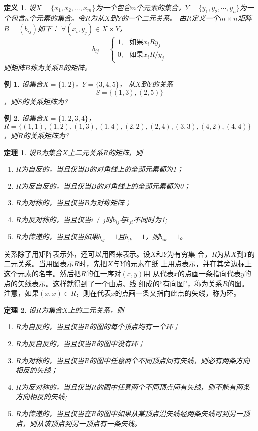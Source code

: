 \documentclass{book}[oneside]
\newtheorem{Def}{定义}[chapter]
\newtheorem{Thm}{定理}[chapter]
\newtheorem{Example}{例}[chapter]
\begin{document}
\begin{CJK*}{UTF8}{gbsn}
   \begin{Def}
    设$X=\{x_1, x_2, \ldots, x_m\}$为一个包含$m$个元素的集合，$Y=\{y_1, y_2,
    \cdots, y_n\}$为一个包含$n$个元素的集合。令$R$为从$X$到$Y$的一个二元关系。
    由$R$定义一个$m \times n$矩阵$B = (b_{ij})$如下： $\forall (x_i, y_j) \in X \times Y$，
\[
    b_{ij}=
      \begin{cases}
        1,&\text{如果}x_iRy_j\\
        0,&\text{如果}x_iR\!\!\! / y_j
      \end{cases}
\]
    则矩阵$B$称为关系$R$的矩阵。
  \end{Def}

  \begin{Example}
    设集合$X=\{1,2\}$，$Y=\{3,4,5\}$， 从$X$到$Y$的关系\[S=\{(1,3), (2, 5)\}\]，则$S$的关系矩阵为?
  \end{Example}
  
  \begin{Example}
    设集合$X = \{1,2,3,4\}$，$R = \{(1,1),(1,2),(1,3),(1,4),(2,2),(2,4),(3,3),(4,2),(4,4)\}$，则$R$的关系矩阵为?
  \end{Example}

  \begin{Thm}
  设$B$为集合$X$上二元关系$R$的矩阵，则
  \begin{enumerate}
  \item $R$为自反的，当且仅当$B$的对角线上的全部元素都为1；
  \item $R$为反自反的，当且仅当$B$的对角线上的全部元素都为0；
  \item $R$为对称的，当且仅当$B$为对称矩阵；
  \item $R$为反对称的，当且仅当$i \neq j$时$b_{ij}$与$b_{ji}$不同时为1;
  \item $R$为传递的，当且仅当如果$b_{ij}=1$且$b_{jk}=1$，则$b_{ik}=1$。
  \end{enumerate}
\end{Thm}

关系除了用矩阵表示外，还可以用图来表示。设$X$和$Y$为有穷集
合，$R$为从$X$到$Y$的二元关系。当用图表示$R$时，先把$X$与$Y$的元素在纸
上用点表示，并在其旁边标上这个元素的名字。然后把$R$的任一序对$(x,y)$用
从代表$x$的点画一条指向代表$y$的点的矢线表示。这样就得到了一个由点、线
组成的“有向图”，称为关系$R$的图。注意，如果$(x,x)\in R$，则在代表$x$的点画一条又指向此点的矢线，称为环。
  \begin{Thm}
  设$R$为集合$X$上的二元关系，则
  \begin{enumerate}
  \item $R$为自反的，当且仅当$R$的图的每个顶点均有一个环；
  \item $R$为反自反的，当且仅当$R$的图中没有环；
  \item $R$为对称的，当且仅当$R$的图中任意两个不同顶点间有矢线，则必有两条方向相反的矢线；
  \item $R$为反对称的，当且仅当$R$的图中任意两个不同顶点间有矢线，则不能有两条方向相反的矢线;
  \item $R$为传递的，当且仅当在$R$的图中如果从某顶点沿矢线经两条矢线可到另一顶点，则从该顶点到另一顶点有一条矢线。
  \end{enumerate}
\end{Thm}


\end{CJK*}
\end{document}
